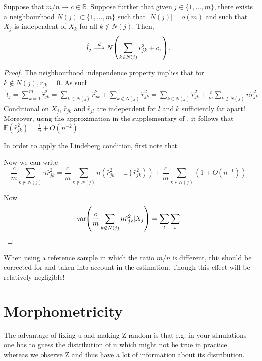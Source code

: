 \begin{proposition}
	Suppose that $ m/n \rightarrow c \in \mathbb{R} $. Suppose further that given $ j \in \lbrace 1, \dots, m\rbrace $, there exists a neighbourhood $ N(j) \subset \lbrace 1, \dots, m\rbrace $ such that $ |N(j)| = o(m) $ and such that $ X_j $ is independent of $ X_k $ for all $ k \not\in N(j) $. Then,
	\begin{equation*}
		\hat{l}_j \convd N\left(\sum_{k \in N(j)} r^2_{jk} + c, \right).
	\end{equation*}
\end{proposition}
\begin{proof}
	The neighbourhood independence property implies that for $ k \not\in N(j), r_{jk} = 0 $. As such
	\begin{align*}
		\hat{l}_j = \sum_{k = 1}^m \hat{r}^2_{jk} = \sum_{k \in N(j)} \hat{r}^2_{jk} + \sum_{k \not\in N(j)} \hat{r}^2_{jk} =  \sum_{k \in N(j)} \hat{r}^2_{jk} + \frac{c}{m}\sum_{k \not\in N(j)} n\hat{r}^2_{jk}
	\end{align*}
	Conditional on $ X_j $, $ \hat{r}_{jk} $ and $ \hat{r}_{jl} $ are independent for $ l $ and $ k $ sufficiently far apart! Moreover, using the approximation in the supplementary of \cite{Bulik2015}, it follows that $ \mathbb{E}(\hat{r}^2_{jk}) = \frac{1}{n} + O(n^{-2}) $
	
	In order to apply the Lindeberg condition, first note that 
	
	Now we can write 
	\begin{equation*}
		\frac{c}{m}\sum_{k \not\in N(j)} n\hat{r}^2_{jk} = 	\frac{c}{m}\sum_{k \not\in N(j)} n\left(\hat{r}^2_{jk} - \mathbb{E}(\hat{r}^2_{jk})\right) + \frac{c}{m}\sum_{k \not\in N(j)} \left(1 + O(n^{-1})\right)
	\end{equation*}
	
	Now 
	\begin{equation*}
	\var\left(\frac{c}{m}\sum_{k \not\in N(j)} n\hat{r}^2_{jk} | X_j\right) = \sum_l \sum_k 
	\end{equation*}
	
	
\end{proof}

When using a reference sample in which the ratio $ m/n $ is different, this should be corrected for and taken into account in the estimation. Though this effect will be relatively negligible!

\section{Morphometricity}
The advantage of fixing u and making Z random is that e.g. in your simulations one has to guess the distribution of u which might not be true in practice whereas we observe Z and thus have a lot of information about its distribution.

